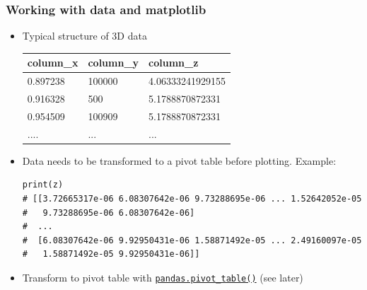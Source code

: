 \documentclass[xcolor=table]{beamer}
\begin{document}
\begin{frame}[fragile]
\frametitle{Working with data and matplotlib}
\begin{itemize}%
    \item Typical structure of 3D data 
\begin{center}
    { \ttfamily
    \begin{tabular}{|l|l|l|}\hline
        column\_x & column\_y & column\_z \\ \hline
        0.897238 & 100000 & 4.06333241929155 \\
        0.916328 & 500 & 5.1788870872331 \\
        0.954509 & 100909 & 5.1788870872331 \\
        .... & ... & ... \\ \hline
    \end{tabular}
    } 
\end{center}
    \item  Data needs to be transformed to a pivot table before plotting. Example:
\begin{lstlisting}[style=pythonsmall]
print(z)
# [[3.72665317e-06 6.08307642e-06 9.73288695e-06 ... 1.52642052e-05
#   9.73288695e-06 6.08307642e-06]
#  ...
#  [6.08307642e-06 9.92950431e-06 1.58871492e-05 ... 2.49160097e-05
#   1.58871492e-05 9.92950431e-06]]
\end{lstlisting} \pause \vspace{-20pt}
    \item Transform to pivot table with \href{https://pandas.pydata.org/pandas-docs/stable/reference/api/pandas.pivot_table.html}{\texttt{pandas.pivot\_table()}} (see later)
\end{itemize}
\end{frame}
\end{document}
